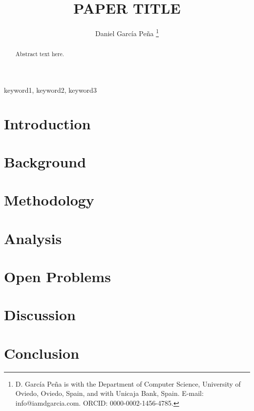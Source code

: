 \documentclass[journal]{IEEEtran}
\begin{document}
\title{PAPER TITLE}

\author{Daniel Garc\'ia Pe\~na%
\thanks{D. Garc\'ia Pe\~na is with the Department of Computer Science,
University of Oviedo, Oviedo, Spain, and with Unicaja Bank, Spain.
E-mail: info@iamdgarcia.com. ORCID: 0000-0002-1456-4785.}}

\maketitle

\begin{abstract}
Abstract text here.
\end{abstract}

\begin{IEEEkeywords}
keyword1, keyword2, keyword3
\end{IEEEkeywords}

\section{Introduction}


\section{Background}


\section{Methodology}


\section{Analysis}


\section{Open Problems}


\section{Discussion}


\section{Conclusion}




\end{document}

